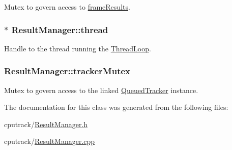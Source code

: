 Mutex to govern access to \hyperlink{class_result_manager_a2b7ba6801c7d9cfff0b4f8ee5ffc7569}{frame\+Results}. 

\subsubsection[{\texorpdfstring{thread}{thread}}]{$\ast$ Result\+Manager\+::thread\hspace{0.3cm}{\ttfamily [protected]}}\hypertarget{class_result_manager_ab3ef361e61d16ef54726cd7b78f03cd5}{}\label{class_result_manager_ab3ef361e61d16ef54726cd7b78f03cd5}


Handle to the thread running the \hyperlink{class_result_manager_a0aff477d777703dd9f1e01ba0bd6f2d8}{Thread\+Loop}. 

\subsubsection[{\texorpdfstring{tracker\+Mutex}{trackerMutex}}]{ Result\+Manager\+::tracker\+Mutex\hspace{0.3cm}{\ttfamily [protected]}}\hypertarget{class_result_manager_ab8b3508ac87e3990b0b6a70c9031719d}{}\label{class_result_manager_ab8b3508ac87e3990b0b6a70c9031719d}


Mutex to govern access to the linked \hyperlink{class_queued_tracker}{Queued\+Tracker} instance. 



The documentation for this class was generated from the following files\+:\begin{DoxyCompactItemize}
\item 
cputrack/\hyperlink{_result_manager_8h}{Result\+Manager.\+h}\item 
cputrack/\hyperlink{_result_manager_8cpp}{Result\+Manager.\+cpp}\end{DoxyCompactItemize}
